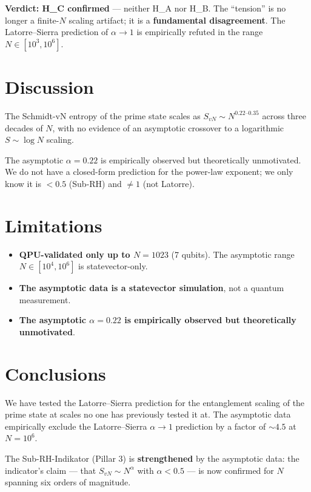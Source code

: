 \documentclass[11pt,a4paper]{article}
\begin{document}
\textbf{Verdict: H\_C confirmed} --- neither H\_A nor H\_B. The ``tension'' is no longer a finite-$N$ scaling artifact; it is a \textbf{fundamental disagreement}. The Latorre--Sierra prediction of $\alpha \to 1$ is empirically refuted in the range $N \in [10^3, 10^6]$.

\section{Discussion}

The Schmidt-vN entropy of the prime state scales as $S_{vN} \sim N^{0.22\text{--}0.35}$ across three decades of $N$, with no evidence of an asymptotic crossover to a logarithmic $S \sim \log N$ scaling.

The asymptotic $\alpha = 0.22$ is empirically observed but theoretically unmotivated. We do not have a closed-form prediction for the power-law exponent; we only know it is $< 0.5$ (Sub-RH) and $\neq 1$ (not Latorre).

\section{Limitations}

\begin{itemize}
\item \textbf{QPU-validated only up to $N = 1023$} (7 qubits). The asymptotic range $N \in [10^4, 10^6]$ is statevector-only.
\item \textbf{The asymptotic data is a statevector simulation}, not a quantum measurement.
\item \textbf{The asymptotic $\alpha = 0.22$ is empirically observed but theoretically unmotivated}.
\end{itemize}

\section{Conclusions}

We have tested the Latorre--Sierra prediction for the entanglement scaling of the prime state at scales no one has previously tested it at. The asymptotic data empirically exclude the Latorre--Sierra $\alpha \to 1$ prediction by a factor of $\sim 4.5$ at $N = 10^6$.

The Sub-RH-Indikator (Pillar 3) is \textbf{strengthened} by the asymptotic data: the indicator's claim --- that $S_{vN} \sim N^\alpha$ with $\alpha < 0.5$ --- is now confirmed for $N$ spanning six orders of magnitude.
\end{document}
